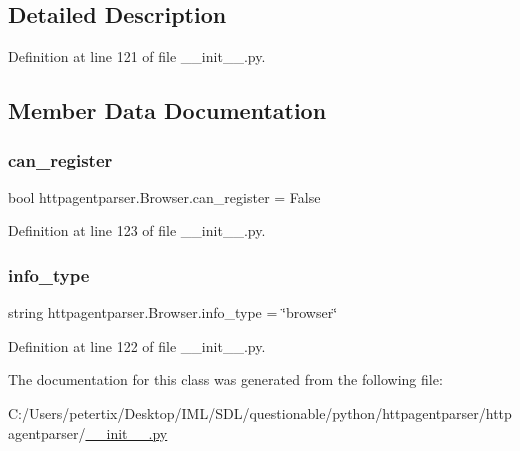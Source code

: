 \subsection{Detailed Description}


Definition at line 121 of file \+\_\+\+\_\+init\+\_\+\+\_\+.\+py.



\subsection{Member Data Documentation}
\hypertarget{classhttpagentparser_1_1_browser_a6d09a51067f73d88dd2af5997fd44e1a}{}\label{classhttpagentparser_1_1_browser_a6d09a51067f73d88dd2af5997fd44e1a} 
\subsubsection{\texorpdfstring{can\+\_\+register}{can\_register}}
{\footnotesize\ttfamily bool httpagentparser.\+Browser.\+can\+\_\+register = False\hspace{0.3cm}{\ttfamily [static]}}



Definition at line 123 of file \+\_\+\+\_\+init\+\_\+\+\_\+.\+py.

\hypertarget{classhttpagentparser_1_1_browser_a1ed49119b85e7559bb054a217c6e6876}{}\label{classhttpagentparser_1_1_browser_a1ed49119b85e7559bb054a217c6e6876} 
\subsubsection{\texorpdfstring{info\+\_\+type}{info\_type}}
{\footnotesize\ttfamily string httpagentparser.\+Browser.\+info\+\_\+type = \char`\"{}browser\char`\"{}\hspace{0.3cm}{\ttfamily [static]}}



Definition at line 122 of file \+\_\+\+\_\+init\+\_\+\+\_\+.\+py.



The documentation for this class was generated from the following file\+:\begin{DoxyCompactItemize}
\item 
C\+:/\+Users/petertix/\+Desktop/\+I\+M\+L/\+S\+D\+L/questionable/python/httpagentparser/httpagentparser/\hyperlink{____init_____8py}{\+\_\+\+\_\+init\+\_\+\+\_\+.\+py}\end{DoxyCompactItemize}
